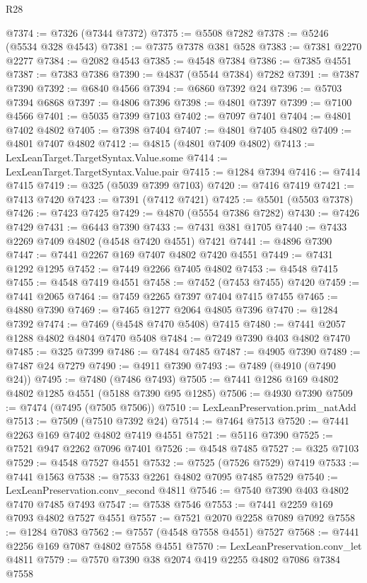\begin{lexlean}{R28}
\begin{coremodule}
@7374 := @7326 (@7344 @7372)
@7375 := @5508 @7282
@7378 := @5246 (@5534 @328 @4543)
@7381 := @7375 @7378 @381 @528
@7383 := @7381 @2270 @2277
@7384 := @2082 @4543
@7385 := @4548 @7384
@7386 := @7385 @4551
@7387 := @7383 @7386
@7390 := @4837 (@5544 @7384) @7282
@7391 := @7387 @7390
@7392 := @6840 @4566
@7394 := @6860 @7392 @24
@7396 := @5703 @7394 @6868
@7397 := @4806 @7396
@7398 := @4801 @7397
@7399 := @7100 @4566
@7401 := @5035 @7399 @7103
@7402 := @7097 @7401
@7404 := @4801 @7402 @4802
@7405 := @7398 @7404
@7407 := @4801 @7405 @4802
@7409 := @4801 @7407 @4802
@7412 := @4815 (@4801 @7409 @4802)
@7413 := LexLeanTarget.TargetSyntax.Value.some
@7414 := LexLeanTarget.TargetSyntax.Value.pair
@7415 := @1284 @7394
@7416 := @7414 @7415
@7419 := @325 (@5039 @7399 @7103)
@7420 := @7416 @7419
@7421 := @7413 @7420
@7423 := @7391 (@7412 @7421)
@7425 := @5501 (@5503 @7378)
@7426 := @7423 @7425
@7429 := @4870 (@5554 @7386 @7282)
@7430 := @7426 @7429
@7431 := @6443 @7390
@7433 := @7431 @381 @1705
@7440 := @7433 @2269 @7409 @4802 (@4548 @7420 @4551) @7421
@7441 := @4896 @7390
@7447 := @7441 @2267 @169 @7407 @4802 @7420 @4551
@7449 := @7431 @1292 @1295
@7452 := @7449 @2266 @7405 @4802
@7453 := @4548 @7415
@7455 := @4548 @7419 @4551
@7458 := @7452 (@7453 @7455) @7420
@7459 := @7441 @2065
@7464 := @7459 @2265 @7397 @7404 @7415 @7455
@7465 := @4880 @7390
@7469 := @7465 @1277 @2064 @4805 @7396
@7470 := @1284 @7392
@7474 := @7469 (@4548 @7470 @5408) @7415
@7480 := @7441 @2057 @1288 @4802 @4804 @7470 @5408
@7484 := @7249 @7390 @403 @4802 @7470
@7485 := @325 @7399
@7486 := @7484 @7485
@7487 := @4905 @7390
@7489 := @7487 @24 @7279
@7490 := @4911 @7390
@7493 := @7489 (@4910 (@7490 @24))
@7495 := @7480 (@7486 @7493)
@7505 := @7441 @1286 @169 @4802 @4802 @1285 @4551 (@5188 @7390 @95 @1285)
@7506 := @4930 @7390
@7509 := @7474 (@7495 (@7505 @7506))
@7510 := LexLeanPreservation.prim_natAdd
@7513 := @7509 (@7510 @7392 @24)
@7514 := @7464 @7513
@7520 := @7441 @2263 @169 @7402 @4802 @7419 @4551
@7521 := @5116 @7390
@7525 := @7521 @947 @2262 @7096 @7401
@7526 := @4548 @7485
@7527 := @325 @7103
@7529 := @4548 @7527 @4551
@7532 := @7525 (@7526 @7529) @7419
@7533 := @7441 @1563
@7538 := @7533 @2261 @4802 @7095 @7485 @7529
@7540 := LexLeanPreservation.conv_second @4811
@7546 := @7540 @7390 @403 @4802 @7470 @7485 @7493
@7547 := @7538 @7546
@7553 := @7441 @2259 @169 @7093 @4802 @7527 @4551
@7557 := @7521 @2070 @2258 @7089 @7092
@7558 := @1284 @7083
@7562 := @7557 (@4548 @7558 @4551) @7527
@7568 := @7441 @2256 @169 @7087 @4802 @7558 @4551
@7570 := LexLeanPreservation.conv_let @4811
@7579 := @7570 @7390 @38 @2074 @419 @2255 @4802 @7086 @7384 @7558

\end{coremodule}
\end{lexlean}
